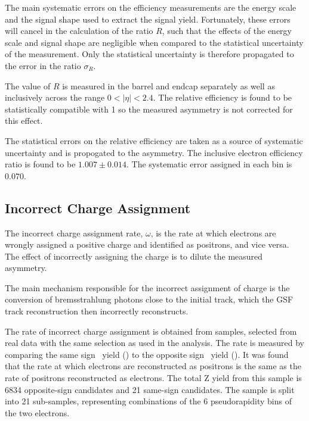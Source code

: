 The main systematic errors on the efficiency measurements are the energy scale
and the signal shape used to extract the signal yield. Fortunately, these
errors will cancel in the calculation of the ratio $R$, such that the
effects of the energy scale and signal shape are negligible
when compared to the statistical uncertainty of the measurement. Only the
statistical uncertainty is therefore propagated to the error in the ratio
$\sigma_R$.


The value of $R$ is measured in the barrel and endcap separately as well as inclusively
across the range $0<| \eta |< 2.4$. 
The relative efficiency is found to be statistically compatible with 1 so the
measured asymmetry is not corrected for this effect.

The statistical errors on the relative efficiency are taken as a source of
systematic uncertainty and is propogated to the asymmetry. The inclusive
electron efficiency ratio is found to be $1.007\pm0.014$.  The systematic error
assigned in each bin is $0.070$.  

\subsection{Incorrect Charge Assignment}

The incorrect charge assignment rate, $\omega$, is the rate at which electrons are
wrongly assigned a positive charge and identified as positrons, and vice versa.
The effect of incorrectly assigning the charge is to dilute the measured
asymmetry.

The main mechanism responsible for the incorrect assignment of charge is the
conversion of bremsstrahlung photons close to the initial track, which the GSF
track reconstruction then incorrectly reconstructs.

The rate of incorrect charge assignment is obtained from \Zee samples, selected from
real data with the same selection as used in the analysis. 
The rate is measured by comparing the
same sign \PZ\ yield (\HepProcess{\PZ\to\Pepm\Pepm}) to the opposite sign \PZ\
yield (\HepProcess{\PZ\to\Pelectron\APelectron}).
It was found that the rate at which electrons are reconstructed as positrons is
the same as the rate of positrons reconstructed as electrons.
The total Z yield from this sample is 6834 opposite-sign \PZ candidates and 21
same-sign \PZ candidates.
The sample is split into 21 sub-samples, representing
combinations of the 6 pseudorapidity bins of the two electrons.

